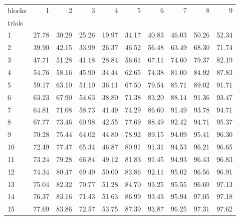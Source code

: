\begin{tabularx}{\textwidth}{@{}Xrrrrrrrrr@{}}
\toprule
blocks & 1 & 2 & 3 & 4 & 5 & 6 & 7 & 8 & 9 \\
trials &  &  &  &  &  &  &  &  &  \\
\midrule
1 & 27.78 & 30.29 & 25.26 & 19.97 & 34.17 & 40.83 & 46.03 & 50.26 & 52.34 \\
2 & 39.90 & 42.15 & 33.99 & 26.37 & 46.52 & 56.48 & 63.49 & 68.30 & 71.74 \\
3 & 47.71 & 51.28 & 41.18 & 28.84 & 56.61 & 67.11 & 74.60 & 79.37 & 82.19 \\
4 & 54.76 & 58.16 & 45.90 & 34.44 & 62.65 & 74.38 & 81.00 & 84.92 & 87.83 \\
5 & 59.17 & 63.10 & 51.10 & 36.11 & 67.50 & 79.54 & 85.71 & 89.02 & 91.71 \\
6 & 63.23 & 67.90 & 54.63 & 38.80 & 71.38 & 83.20 & 88.14 & 91.36 & 93.47 \\
7 & 64.81 & 71.08 & 58.73 & 41.49 & 74.29 & 86.60 & 91.49 & 93.78 & 94.71 \\
8 & 67.77 & 73.46 & 60.98 & 42.55 & 77.69 & 88.49 & 92.42 & 94.71 & 95.37 \\
9 & 70.28 & 75.44 & 64.02 & 44.80 & 78.92 & 89.15 & 94.09 & 95.41 & 96.30 \\
10 & 72.49 & 77.47 & 65.34 & 46.87 & 80.91 & 91.31 & 94.53 & 96.21 & 96.65 \\
11 & 73.24 & 79.28 & 66.84 & 49.12 & 81.83 & 91.45 & 94.93 & 96.43 & 96.83 \\
12 & 74.34 & 80.47 & 69.49 & 50.00 & 83.86 & 92.11 & 95.02 & 96.56 & 96.91 \\
13 & 75.04 & 82.32 & 70.77 & 51.28 & 84.70 & 93.25 & 95.55 & 96.69 & 97.13 \\
14 & 76.37 & 83.16 & 71.43 & 51.63 & 86.99 & 93.43 & 95.94 & 97.05 & 97.18 \\
15 & 77.69 & 83.86 & 72.57 & 53.75 & 87.39 & 93.87 & 96.25 & 97.31 & 97.62 \\
\bottomrule
\end{tabularx}
